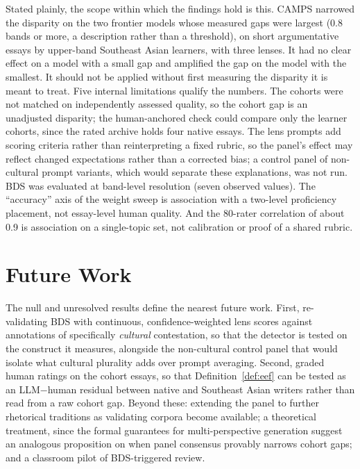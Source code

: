 Stated plainly, the scope within which the findings hold is this.
CAMPS narrowed the disparity on the two frontier models whose
measured gaps were largest (0.8 bands or more, a description rather
than a threshold), on short argumentative essays by upper-band
Southeast Asian learners, with three lenses. It
had no clear effect on a model with a small gap and amplified the gap
on the model with the smallest. It should not be applied without first measuring the disparity it
is meant to treat. Five internal limitations qualify the numbers. The cohorts were not matched on
independently assessed quality, so the cohort gap is an unadjusted
disparity; the human-anchored check could compare only the learner
cohorts, since the rated archive holds four native essays. The lens
prompts add scoring criteria rather than reinterpreting a fixed
rubric, so the panel's effect may reflect changed expectations rather
than a corrected bias; a control panel of non-cultural prompt
variants, which would separate these explanations, was not run. BDS
was evaluated at band-level resolution (seven observed values). The
``accuracy'' axis of the weight sweep is association with a
two-level proficiency placement, not essay-level human quality. And
the 80-rater correlation of about 0.9 is association on a
single-topic set, not calibration or proof of a shared rubric.

\section{Future Work}
\label{sec:future-work}

The null and unresolved results define the nearest future work.
First, re-validating BDS with continuous, confidence-weighted lens
scores against annotations of specifically \emph{cultural}
contestation, so that the detector is tested on the construct it
measures, alongside the non-cultural control panel that would
isolate what cultural plurality adds over prompt averaging. Second,
graded human ratings on the cohort essays, so that
Definition~\ref{def:eef} can be tested as an LLM$-$human residual
between native and Southeast Asian writers rather than read from a
raw cohort gap. Beyond these: extending the panel to further rhetorical traditions
as validating corpora become available; a theoretical treatment, since
the formal guarantees for multi-perspective generation
\citep{dorleon2026uncovering} suggest an analogous proposition on
when panel consensus provably narrows cohort gaps; and a classroom
pilot of BDS-triggered review.
